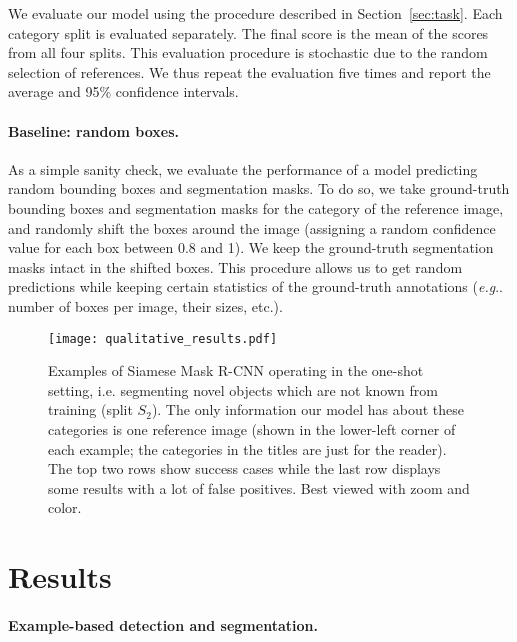 \documentclass{article}
\makeatletter
\def\onedot{\ifx\let@token.\else.\null\fi\xspace}
\def\eg{\emph{e.g}\onedot} \def\Eg{\emph{E.g}\onedot}
\makeatother
\begin{document}
We evaluate our model using the procedure described in Section~\ref{sec:task}. Each category split is evaluated separately. The final score is the mean of the scores from all four splits. This evaluation procedure is stochastic due to the random selection of references. We thus repeat the evaluation five times and report the average and 95\% confidence intervals.

\paragraph{Baseline: random boxes.}
As a simple sanity check, we evaluate the performance of a model predicting random bounding boxes and segmentation masks. To do so, we take ground-truth bounding boxes and segmentation masks for the category of the reference image, and randomly shift the boxes around the image (assigning a random confidence value for each box between 0.8 and 1). We keep the ground-truth segmentation masks intact in the shifted boxes. This procedure allows us to get random predictions while keeping certain statistics of the ground-truth annotations (\eg number of boxes per image, their sizes, etc.).


\begin{figure*}[t]
    \begin{center}
    \texttt{[image: qualitative\_results.pdf]}
    \end{center}
    \vspace{-0.2cm}
    \caption{Examples of Siamese Mask R-CNN operating in the one-shot setting, i.e. segmenting novel objects which are not known from training (split $S_2$). The only information our model has about these categories is one reference image (shown in the lower-left corner of each example; the categories in the titles are just for the reader). The top two rows show success cases while the last row displays some results with a lot of false positives. Best viewed with zoom and color.}
\label{fig:visual_examples}
\end{figure*}



\section{Results}
\label{sec:results}

\paragraph{Example-based detection and segmentation.}
\end{document}
